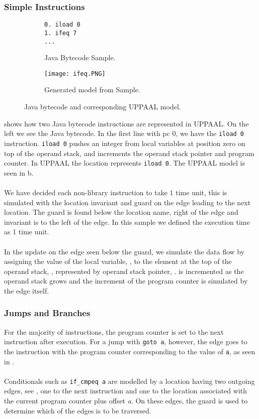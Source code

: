 \subsubsection{Simple Instructions}
\begin{figure}[H]
\centering
\begin{subfigure}{.3\textwidth}
  \begin{lstlisting}
0. iload 0
1. ifeq 7
...
  \end{lstlisting}
  \caption{Java Bytecode Sample.}
\end{subfigure} 
\hspace{10px}
\begin{subfigure}{.6\textwidth}
  \texttt{[image: ifeq.PNG]}
  \caption{Generated model from Sample.}
\end{subfigure}
\caption{Java bytecode and corresponding UPPAAL model.}
\label{fig:uppaal1}
\end{figure}

 shows how two Java bytecode instructions are represented in UPPAAL. On the left we see the Java bytecode. In the first line with pc 0, we have the \texttt{iload 0} instruction. \texttt{iload 0} pushes an integer from local variables at position zero on top of the operand stack, and increments the operand stack pointer and program counter.
In UPPAAL the location  represents \texttt{iload 0}. The UPPAAL model is seen in b.\\\\
We have decided each non-library instruction to take $1$ time unit, this is simulated with the location invariant  and guard  on the edge leading to the next location. The guard is found below the location name, right of the edge and invariant is to the left of the edge. In this sample we defined the execution time as 1 time unit.\\\\
In the update on the edge seen below the guard, we simulate the data flow by assigning the value of the local variable, , to the element at the top of the operand stack, , represented by operand stack pointer, .  is incremented as the operand stack grows and the increment of the program counter is simulated by the edge itself.

\subsubsection{Jumps and Branches}
For the majority of instructions, the program counter is set to the next instruction after execution. For a jump with \texttt{goto a}, however, the edge goes to the instruction with the program counter corresponding to the value of \texttt{a}, as seen in .\\\\
Conditionals such as \texttt{if\_cmpeq a} are modelled by a location having two outgoing edges, see , one to the next instruction and one to the location associated with the current program counter plus offset \textit{a}. On these edges, the guard is used to determine which of the edges is to be traversed.

